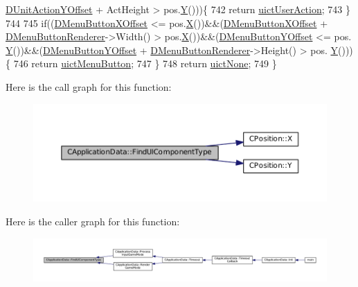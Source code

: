 \begin{DoxyCode}
      \hyperlink{classCApplicationData_a8ccfb55bd25cba0e6eb66573ba9c8b3c}{DUnitActionYOffset} + ActHeight > pos.\hyperlink{classCPosition_a1aa8a30e2f08dda1f797736ba8c13a87}{Y}()))\{
742         \textcolor{keywordflow}{return} \hyperlink{classCApplicationData_ad49585591fc53bff1c89bc512170280da9b2752db122b319f942c3b69c2accfab}{uictUserAction};
743     \}
744     
745     \textcolor{keywordflow}{if}((\hyperlink{classCApplicationData_a04283b17a8c04af8325de4304a848095}{DMenuButtonXOffset} <= pos.\hyperlink{classCPosition_a9a6b94d3b91df1492d166d9964c865fc}{X}())&&(\hyperlink{classCApplicationData_a04283b17a8c04af8325de4304a848095}{DMenuButtonXOffset} + 
      \hyperlink{classCApplicationData_a2c9f10aa452454a016e0164f6ce777a6}{DMenuButtonRenderer}->Width() > pos.\hyperlink{classCPosition_a9a6b94d3b91df1492d166d9964c865fc}{X}())&&(\hyperlink{classCApplicationData_a63012360d0a98eef89707a503f4379a8}{DMenuButtonYOffset} <= pos.
      \hyperlink{classCPosition_a1aa8a30e2f08dda1f797736ba8c13a87}{Y}())&&(\hyperlink{classCApplicationData_a63012360d0a98eef89707a503f4379a8}{DMenuButtonYOffset} + \hyperlink{classCApplicationData_a2c9f10aa452454a016e0164f6ce777a6}{DMenuButtonRenderer}->Height() > pos.
      \hyperlink{classCPosition_a1aa8a30e2f08dda1f797736ba8c13a87}{Y}()))\{
746         \textcolor{keywordflow}{return} \hyperlink{classCApplicationData_ad49585591fc53bff1c89bc512170280da8323c73a1745d4b4e6e469088041f264}{uictMenuButton};
747     \}
748     \textcolor{keywordflow}{return} \hyperlink{classCApplicationData_ad49585591fc53bff1c89bc512170280da21bc83c610f1f8b1d686aed22d343f93}{uictNone};
749 \}
\end{DoxyCode}
Here is the call graph for this function\+:\nopagebreak
\begin{figure}[H]
\begin{center}
\leavevmode
\includegraphics[width=350pt]{classCApplicationData_a1fb2747750babd9b82f51ce206ee6755_cgraph}
\end{center}
\end{figure}
Here is the caller graph for this function\+:\nopagebreak
\begin{figure}[H]
\begin{center}
\leavevmode
\includegraphics[width=350pt]{classCApplicationData_a1fb2747750babd9b82f51ce206ee6755_icgraph}
\end{center}
\end{figure}
